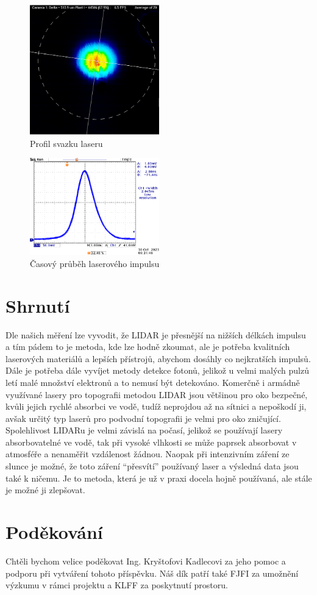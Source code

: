 \documentclass[12pt,a4paper]{article}
\begin{document}
\begin{figure}[h!]
    \centering
    \includegraphics[width=0.5\textwidth]{profil.png}
    \caption{Profil svazku laseru}
\end{figure}

\begin{figure}[h!]
    \centering
    \includegraphics[width=0.5\textwidth]{prubeh_impulsu.png}
    \caption{Časový průběh laserového impulsu}
\end{figure}


\pagebreak
\section{Shrnutí}
Dle našich měření lze vyvodit, že LIDAR je přesnější na nižších délkách impulsu a tím pádem to je metoda, kde lze hodně zkoumat, ale je potřeba kvalitních laserových materiálů a lepších přístrojů, abychom dosáhly co nejkratších impulsů. Dále je potřeba dále vyvíjet metody detekce fotonů, jelikož u velmi malých pulzů letí malé množství elektronů a to nemusí být detekováno. Komerčně i armádně využívané lasery pro topografii metodou LIDAR jsou většinou pro oko bezpečné, kvůli jejich rychlé absorbci ve vodě, tudíž neprojdou až na sítnici a nepoškodí ji, avšak určitý typ laserů pro podvodní topografii je velmi pro oko zničující. Spolehlivost LIDARu je velmi závislá na počasí, jelikož se používají lasery absorbovatelné ve vodě, tak při vysoké vlhkosti se může paprsek absorbovat v atmosféře a nenaměřit vzdálenost žádnou. Naopak při intenzivním záření ze slunce je možné, že toto záření “přesvítí” používaný laser a výsledná data jsou také k ničemu.
Je to metoda, která je už v praxi docela hojně používaná, ale stále je možné ji zlepšovat.


\section*{Poděkování}
Chtěli bychom velice poděkovat Ing. Kryštofovi Kadlecovi za jeho pomoc a podporu při vytváření tohoto příspěvku.
Náš dík patří také FJFI za umožnění výzkumu v rámci projektu a KLFF za poskytnutí prostoru.
\printbibliography
\end{document}
